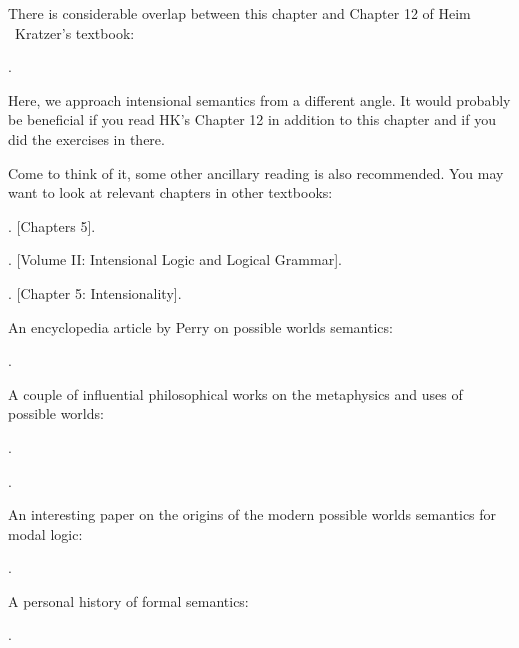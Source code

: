 {\setlength{\parindent}{0pt}\nonzeroparskip

There is considerable overlap between this chapter and Chapter 12 of Heim \amp\ Kratzer's textbook:
\begin{bibentrylist}
	\item {}. 
\end{bibentrylist}

Here, we approach intensional semantics from a different angle. It would probably be beneficial if you read H\amp K's Chapter 12 in addition to this chapter and if you did the exercises in there.

Come to think of it, some other ancillary reading is also recommended. You may want to look at relevant chapters in other textbooks:
\begin{bibentrylist}
	\item {}. [Chapters 5]. 
	\item {}. [Volume II: Intensional Logic and Logical Grammar]. 
	\item {}. [Chapter 5: Intensionality]. 
\end{bibentrylist}

An encyclopedia article by Perry on possible worlds semantics:
\begin{bibentrylist}
	\item {}. 
\end{bibentrylist}

A couple of influential philosophical works on the metaphysics and uses of possible worlds:
\begin{bibentrylist}
	\item {}. 
	\item {}. 
\end{bibentrylist}

An interesting paper on the origins of the modern possible worlds semantics for modal logic:
\begin{bibentrylist}
	\item {}.
\end{bibentrylist}

A personal history of formal semantics:
\begin{bibentrylist}
	\item {}.
\end{bibentrylist}

}
